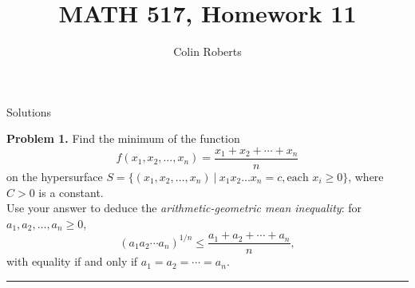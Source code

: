 \documentclass[leqno]{article}
\author{Colin Roberts}
\title{MATH 517, Homework 11}
\theoremstyle{nonumberplain}
\begin{document}
\maketitle
\begin{large}
\begin{center}
Solutions
\end{center}
\end{large}
\pagebreak


\noindent\textbf{Problem 1.} Find the minimum of the function
\[
f(x_1,x_2,\dots,x_n)=\frac{x_1+x_2+\cdots+x_n}{n}
\]
on the hypersurface $S=\{(x_1,x_2,\dots,x_n)~\vert~ x_1x_2\dots x_n=c, \textrm{each $x_i\geq 0$}\}$, where $C>0$ is a constant. \\
Use your answer to deduce the \emph{arithmetic-geometric mean inequality}: for $a_1,a_2,\dots,a_n\geq 0$,
\[
(a_1 a_2 \cdots a_n)^{1/n}\leq \frac{a_1 + a_2 + \cdots + a_n}{n},
\]
with equality if and only if $a_1=a_2=\cdots = a_n$.

\noindent\rule[0.5ex]{\linewidth}{1pt}
\end{document}
